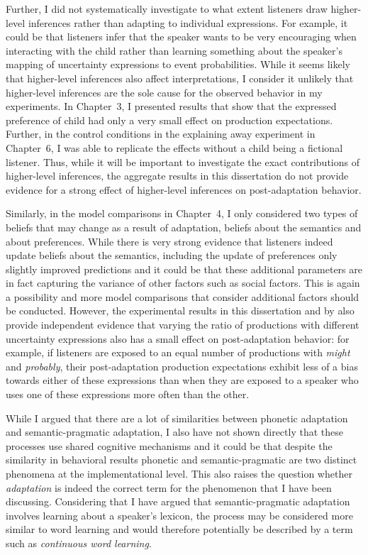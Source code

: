 Further, I did not systematically investigate to what extent listeners draw higher-level inferences rather than adapting to individual expressions. For example, it 
could be that listeners infer that the speaker wants to be very encouraging when interacting with the child rather than learning something about the speaker's mapping of
uncertainty expressions to event probabilities. While it seems likely that higher-level inferences also affect interpretations, I consider it unlikely that higher-level inferences are the
sole cause for the observed behavior in my experiments. In Chapter~3, I presented results that show that the expressed preference of child had only a very small effect on
production expectations. Further, in the control conditions in  the explaining away experiment in Chapter~6, I was able to replicate the effects without a child being a fictional listener.
Thus, while it will be important to investigate the exact contributions of higher-level inferences, the aggregate results in this dissertation do not provide evidence for a strong
effect of higher-level inferences on post-adaptation behavior.

Similarly, in the model comparisons in Chapter~4, I only considered two types of beliefs that may change as a result of adaptation, beliefs about the semantics
and about preferences. While there is very strong evidence that listeners indeed update beliefs about the semantics, including the update of preferences only 
slightly improved predictions and it could be that these additional parameters are in fact capturing the variance of other factors such as social factors. This is again
a possibility and more model comparisons that consider additional factors should be conducted. However, the experimental results in this dissertation and by \textcite{Yildirim2016}
also provide independent evidence that varying the ratio of productions with different uncertainty expressions also has a small effect on post-adaptation behavior: 
for example, if listeners are exposed to an equal number of productions with \textit{might} and \textit{probably}, their post-adaptation production expectations exhibit less of a bias towards either
of these expressions than when they are exposed to a speaker who uses one of these expressions more often than the other. 

While I argued that there are a lot of similarities between phonetic adaptation and semantic-pragmatic adaptation, I also have not shown directly
that these processes use shared cognitive mechanisms and it could be that despite the similarity in behavioral results phonetic and semantic-pragmatic
are two distinct phenomena at the implementational level. This also raises the question whether \textit{adaptation} is indeed the correct term
for the phenomenon that I have been discussing. Considering that I have argued that semantic-pragmatic adaptation involves learning about a speaker's
lexicon, the process may be considered more similar to word learning and would therefore potentially be described by a term such as \textit{continuous word learning}. 

